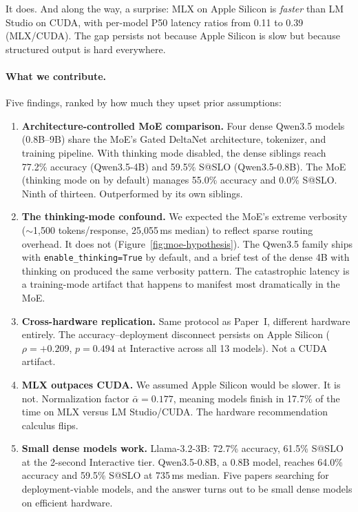 \documentclass[11pt]{article}
\begin{document}
It does.  And along the way, a surprise: MLX on Apple Silicon is \emph{faster} than LM Studio on CUDA, with per-model P50 latency ratios from 0.11 to 0.39 (MLX/CUDA).  The gap persists not because Apple Silicon is slow but because structured output is hard everywhere.

\paragraph{What we contribute.}
Five findings, ranked by how much they upset prior assumptions:

\begin{enumerate}[leftmargin=12pt]
    \item \textbf{Architecture-controlled MoE comparison.} Four dense Qwen3.5 models (0.8B--9B) share the MoE's Gated DeltaNet architecture, tokenizer, and training pipeline.  With thinking mode disabled, the dense siblings reach 77.2\% accuracy (Qwen3.5-4B) and 59.5\% S@SLO (Qwen3.5-0.8B).  The MoE (thinking mode on by default) manages 55.0\% accuracy and 0.0\% S@SLO.  Ninth of thirteen.  Outperformed by its own siblings.

    \item \textbf{The thinking-mode confound.} We expected the MoE's extreme verbosity (${\sim}$1,500 tokens/response, 25,055\,ms median) to reflect sparse routing overhead.  It does not (Figure~\ref{fig:moe-hypothesis}).  The Qwen3.5 family ships with \texttt{enable\_thinking=True} by default, and a brief test of the dense 4B with thinking on produced the same verbosity pattern.  The catastrophic latency is a training-mode artifact that happens to manifest most dramatically in the MoE.

    \item \textbf{Cross-hardware replication.} Same protocol as Paper~I, different hardware entirely.  The accuracy--deployment disconnect persists on Apple Silicon ($\rho = +0.209$, $p = 0.494$ at Interactive across all 13 models).  Not a CUDA artifact.

    \item \textbf{MLX outpaces CUDA.} We assumed Apple Silicon would be slower.  It is not.  Normalization factor $\bar{\alpha} = 0.177$, meaning models finish in 17.7\% of the time on MLX versus LM Studio/CUDA.  The hardware recommendation calculus flips.

    \item \textbf{Small dense models work.} Llama-3.2-3B: 72.7\% accuracy, 61.5\% S@SLO at the 2-second Interactive tier.  Qwen3.5-0.8B, a 0.8B model, reaches 64.0\% accuracy and 59.5\% S@SLO at 735\,ms median.  Five papers searching for deployment-viable models, and the answer turns out to be small dense models on efficient hardware.
\end{enumerate}
\end{document}

